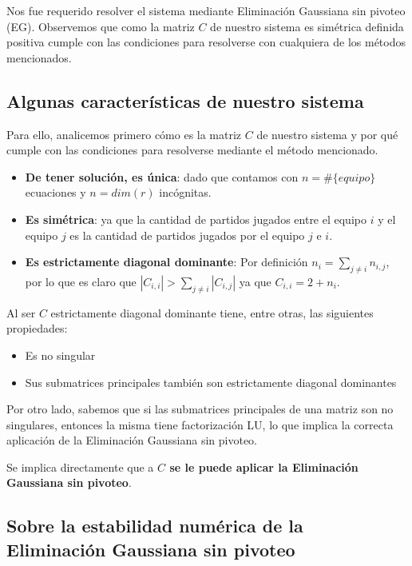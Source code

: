 Nos fue requerido resolver el sistema mediante Eliminación Gaussiana sin pivoteo (EG). Observemos que como la matriz $C$ de nuestro sistema es simétrica definida positiva \cite{CMMpaper} cumple con las condiciones para resolverse con cualquiera de los métodos mencionados.

\subsection{Algunas características de nuestro sistema}

Para ello, analicemos primero cómo es la matriz $C$ de nuestro sistema y por qué cumple con las condiciones para resolverse mediante el método mencionado.

\begin{itemize}
    \item \textbf{De tener solución, es única}: dado que contamos con $n = \#\{equipo\}$ ecuaciones y $n = dim(r)$ incógnitas.
    \item \textbf{Es simétrica}: ya que la cantidad de partidos jugados entre el equipo $i$ y el equipo $j$ es la cantidad de partidos jugados por el equipo $j$ e $i$.
    \item \textbf{Es estrictamente diagonal dominante}: Por definición $n_i = \sum_{j \neq i} n_{i, j}$, por lo que es claro que $|C_{i, i}| > \sum_{j \neq i}|C_{i, j}|$ ya que $C_{i, i} = 2 + n_i$.
\end{itemize}

Al ser $C$ estrictamente diagonal dominante tiene, entre otras, las siguientes propiedades:

\begin{itemize}
    \item Es no singular
    \item Sus submatrices principales también son estrictamente diagonal dominantes
\end{itemize}

Por otro lado, sabemos que si las submatrices principales de una matriz son no singulares, entonces la misma tiene factorización LU, lo que implica la correcta aplicación de la Eliminación Gaussiana sin pivoteo.

Se implica directamente que a \textbf{$C$ se le puede aplicar la Eliminación Gaussiana sin pivoteo}.

\subsection{Sobre la estabilidad numérica de la Eliminación Gaussiana sin pivoteo}\label{estabilidad_numerica}

